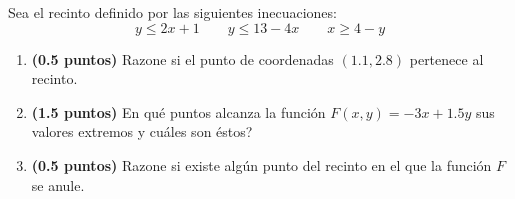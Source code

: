 
Sea el recinto definido por las siguientes inecuaciones:
\[
y\leq 2x+1\qquad y\leq 13-4x\qquad x\geq 4-y
\]
\begin{enumerate}[label=\alph*)]
\item \textbf{(0.5 puntos)} Razone si el punto de coordenadas $(1.1,2.8)$ pertenece al recinto.
\item \textbf{(1.5 puntos)} \textquestiondown{}En qué puntos alcanza la función $F(x,y)=-3x+1.5y$ sus valores extremos y cuáles son éstos?
\item \textbf{(0.5 puntos)} Razone si existe algún punto del recinto en el que la función $F$ se anule.
\end{enumerate}
